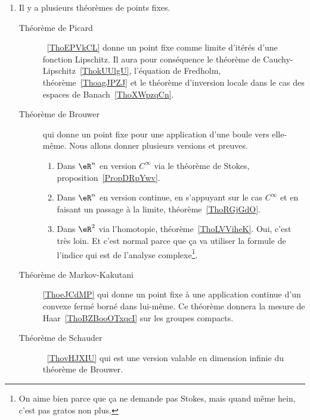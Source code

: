         \label{THEMEooWAYJooUSnmMh}
    \begin{enumerate}
\item
    Il y a plusieurs théorèmes de points fixes.
    \begin{description}
        \item[Théorème de Picard]~\ref{ThoEPVkCL} donne un point fixe comme limite d'itérés d'une fonction Lipschitz. Il aura pour conséquence le théorème de Cauchy-Lipschitz~\ref{ThokUUlgU}, l'équation de Fredholm, théorème~\ref{ThoagJPZJ} et le théorème d'inversion locale dans le cas des espaces de Banach~\ref{ThoXWpzqCn}.
    \item[Théorème de Brouwer] qui donne un point fixe pour une application d'une boule vers elle-même. Nous allons donner plusieurs versions et preuves.
            \begin{enumerate}
                \item
                    Dans \( \eR^n\) en version \( C^{\infty}\) via le théorème de Stokes, proposition~\ref{PropDRpYwv}.
                \item
                    Dans \( \eR^n\) en version continue, en s'appuyant sur le cas \( C^{\infty}\) et en faisant un passage à la limite, théorème~\ref{ThoRGjGdO}.
                \item
                    Dans \( \eR^2\) via l'homotopie, théorème~\ref{ThoLVViheK}. Oui, c'est très loin. Et c'est normal parce que ça va utiliser la formule de l'indice qui est de l'analyse complexe\footnote{On aime bien parce que ça ne demande pas Stokes, mais quand même hein, c'est pas gratos non plus.}.
            \end{enumerate}
        \item[Théorème de Markov-Kakutani]\ref{ThoeJCdMP} qui donne un point fixe à une application continue d'un convexe fermé borné dans lui-même. Ce théorème donnera la mesure de Haar~\ref{ThoBZBooOTxqcI} sur les groupes compacts.
        \item[Théorème de Schauder]~\ref{ThovHJXIU} qui est une version valable en dimension infinie du théorème de Brouwer.
    \end{description}


\end{enumerate}
